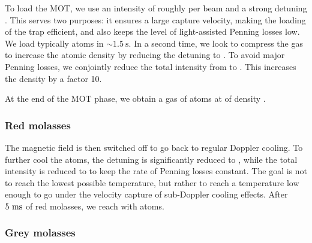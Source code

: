 To load the MOT, we use an intensity of roughly  per beam and a strong detuning . This serves two purposes: it ensures a large capture velocity, making the loading of the trap efficient, and also keeps the level of light-assisted Penning losses low. We load typically  atoms in $\sim 1.5 \ \mathrm{s}$. In a second time, we look to compress the gas to increase the atomic density by reducing the detuning to . To avoid major Penning losses, we conjointly reduce the total intensity from  to . This increases the density by a factor 10.

At the end of the MOT phase, we obtain a gas of  atoms at  of density .

\subsubsection{Red molasses}

The magnetic field is then switched off to go back to regular Doppler cooling. To further cool the atoms, the detuning is significantly reduced to , while the total intensity is reduced to  to keep the rate of Penning losses constant. The goal is not to reach the lowest possible temperature, but rather to reach a temperature low enough to go under the velocity capture of sub-Doppler cooling effects. After $5 \ \rm{ms}$ of red molasses, we reach  with  atoms.

\subsubsection{Grey molasses}


